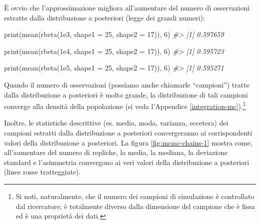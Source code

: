 \documentclass[
  11pt,
]{krantz}
\makeatletter
\newenvironment{Shaded}{\begin{snugshade}}{\end{snugshade}}
\newcommand{\AttributeTok}[1]{\textcolor[rgb]{0.61,0.61,0.61}{#1}}
\newcommand{\CommentTok}[1]{\textcolor[rgb]{0.37,0.37,0.37}{\textit{#1}}}
\newcommand{\DecValTok}[1]{\textcolor[rgb]{0.06,0.06,0.06}{#1}}
\newcommand{\FloatTok}[1]{\textcolor[rgb]{0.06,0.06,0.06}{#1}}
\newcommand{\FunctionTok}[1]{\textcolor[rgb]{0,0,0}{#1}}
\newcommand{\NormalTok}[1]{#1}
\newenvironment{kframe}{%
\medskip{}
\setlength{\fboxsep}{.8em}
 \def\at@end@of@kframe{}%
 \ifinner\ifhmode%
  \def\at@end@of@kframe{\end{minipage}}%
  \begin{minipage}{\columnwidth}%
 \fi\fi%
 \def\FrameCommand##1{\hskip\@totalleftmargin \hskip-\fboxsep
 \colorbox{shadecolor}{##1}\hskip-\fboxsep
     \hskip-\linewidth \hskip-\@totalleftmargin \hskip\columnwidth}%
 \MakeFramed {\advance\hsize-\width
   \@totalleftmargin\z@ \linewidth\hsize
   \@setminipage}}%
 {\par\unskip\endMakeFramed%
 \at@end@of@kframe}
\renewenvironment{Shaded}{\begin{kframe}}{\end{kframe}}
\theoremstyle{definition}
\theoremstyle{definition}
\theoremstyle{definition}
\theoremstyle{definition}
\theoremstyle{remark}
\makeatother
\begin{document}
È ovvio che l'approssimazione migliora all'aumentare del numero di osservazioni estratte dalla distribuzione a posteriori (legge dei grandi numeri):

\begin{Shaded}
\begin{Highlighting}[]
\FunctionTok{print}\NormalTok{(}\FunctionTok{mean}\NormalTok{(}\FunctionTok{rbeta}\NormalTok{(}\FloatTok{1e3}\NormalTok{, }\AttributeTok{shape1 =} \DecValTok{25}\NormalTok{, }\AttributeTok{shape2 =} \DecValTok{17}\NormalTok{)), }\DecValTok{6}\NormalTok{)}
\CommentTok{\#\textgreater{} [1] 0.597659}
\end{Highlighting}
\end{Shaded}

\begin{Shaded}
\begin{Highlighting}[]
\FunctionTok{print}\NormalTok{(}\FunctionTok{mean}\NormalTok{(}\FunctionTok{rbeta}\NormalTok{(}\FloatTok{1e4}\NormalTok{, }\AttributeTok{shape1 =} \DecValTok{25}\NormalTok{, }\AttributeTok{shape2 =} \DecValTok{17}\NormalTok{)), }\DecValTok{6}\NormalTok{)}
\CommentTok{\#\textgreater{} [1] 0.595723}
\end{Highlighting}
\end{Shaded}

\begin{Shaded}
\begin{Highlighting}[]
\FunctionTok{print}\NormalTok{(}\FunctionTok{mean}\NormalTok{(}\FunctionTok{rbeta}\NormalTok{(}\FloatTok{1e5}\NormalTok{, }\AttributeTok{shape1 =} \DecValTok{25}\NormalTok{, }\AttributeTok{shape2 =} \DecValTok{17}\NormalTok{)), }\DecValTok{6}\NormalTok{)}
\CommentTok{\#\textgreater{} [1] 0.595271}
\end{Highlighting}
\end{Shaded}

Quando il numero di osservazioni (possiamo anche chiamarle ``campioni'') tratte dalla distribuzione a posteriori è molto grande, la distribuzione di tali campioni converge alla densità della popolazione (si veda l'Appendice \ref{integration-mc}).\footnote{Si noti, naturalmente, che il numero dei campioni di simulazione è controllato dal ricercatore; è totalmente diverso dalla dimensione del campione che è fissa ed è una proprietà dei dati.}

Inoltre, le statistiche descrittive (es. media, moda, varianza, eccetera) dei campioni estratti dalla distribuzione a posteriori convergeranno ai corrispondenti valori della distribuzione a posteriori. La figura \ref{fig:mcmc-chains-1} mostra come, all'aumentare del numero di repliche, la media, la mediana, la deviazione standard e l'asimmetria convergono ai veri valori della distribuzione a posteriori (linee rosse tratteggiate).
\end{document}
